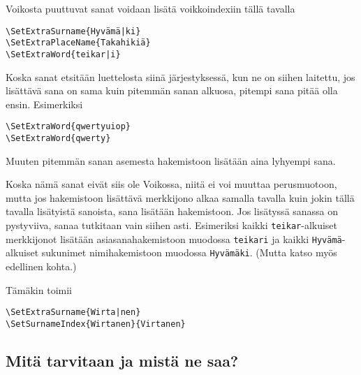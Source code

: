 \documentclass[12pt]{article}
\begin{document}
Voikosta puuttuvat sanat voidaan lisätä voikkoindexiin tällä tavalla

\begin{verbatim}
\SetExtraSurname{Hyvämä|ki}
\SetExtraPlaceName{Takahikiä}
\SetExtraWord{teikar|i}
\end{verbatim}

Koska sanat etsitään luettelosta siinä järjestyksessä, kun ne on
siihen laitettu, jos lisättävä sana on sama kuin pitemmän sanan
alkuosa, pitempi sana pitää olla ensin. Esimerkiksi

\begin{verbatim}
\SetExtraWord{qwertyuiop}
\SetExtraWord{qwerty}
\end{verbatim}

Muuten pitemmän sanan asemesta hakemistoon lisätään aina lyhyempi
sana.

Koska nämä sanat eivät siis ole Voikossa, niitä ei voi muuttaa
perusmuotoon, mutta jos hakemistoon lisättävä merkkijono alkaa samalla
tavalla kuin jokin tällä tavalla lisätyistä sanoista, sana lisätään
hakemistoon. Jos lisätyssä sanassa on pystyviiva, sanaa tutkitaan vain
siihen asti. Esimeriksi kaikki \verb=teikar=-alkuiset merkkijonot
lisätään asiasanahakemistoon muodossa \verb=teikari= ja kaikki
\verb=Hyvämä=-alkuiset sukunimet nimihakemistoon muodossa
\verb=Hyvämäki=. (Mutta katso myös edellinen kohta.)

Tämäkin toimii

\begin{verbatim}
\SetExtraSurname{Wirta|nen}
\SetSurnameIndex{Wirtanen}{Virtanen}
\end{verbatim}


\subsection*{Mitä tarvitaan ja mistä ne saa?}
\end{document}
